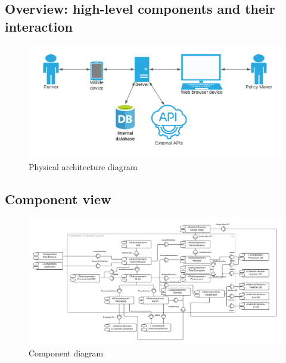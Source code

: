 \subsection{Overview: high-level components and their interaction}


\begin{figure} [!h]
	\centering
	\includegraphics[width=\textwidth]{Images/architecture-diagram.png}
	\caption{\label{fig:physical_diag} Physical architecture diagram}
\end{figure}


\subsection{Component view}
\begin{figure} [!h]
	\centering
	\includegraphics[width=\textwidth]{Images/component-diagram.png}
	\caption{\label{fig:component_diag} Component diagram}
\end{figure}

